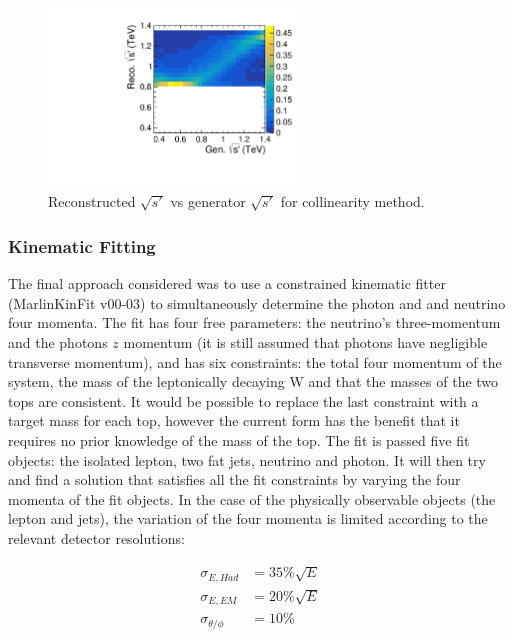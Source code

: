 \begin{figure}
  \centering
  \includegraphics[width=0.6\textwidth]{TopAnalysis/figures/ColEVsTrueE.pdf}
  \caption[Reconstructed $\sqrt{s'}$ vs generator $\sqrt{s'}$ for collinearity method]{Reconstructed $\sqrt{s'}$ vs generator $\sqrt{s'}$ for collinearity method.}
  \label{fig:CollinearitySPrime}
\end{figure}

\subsubsection{Kinematic Fitting}

The final approach considered was to use a constrained kinematic fitter (MarlinKinFit v00-03\cite{List:88030}) to simultaneously determine the photon and and neutrino four momenta. The fit has four free parameters: the neutrino's three-momentum and the photons $z$ momentum (it is still assumed that photons have negligible transverse momentum), and has six constraints: the total four momentum of the system, the mass of the leptonically decaying W and that the masses of the two tops are consistent. It would be possible to replace the last constraint with a target mass for each top, however the current form has the benefit that it requires no prior knowledge of the mass of the top. The fit is passed five fit objects: the isolated lepton, two fat jets, neutrino and photon.  It will then try and find a solution that satisfies all the fit constraints by varying the four momenta of the fit objects. In the case of the physically observable objects (the lepton and jets), the variation of the four momenta is limited according to the relevant detector resolutions:

\begin{align}
  \sigma_{E, Had}&=35\%\sqrt{E}
  \\
  \sigma_{E, EM}&=20\%\sqrt{E}
\\
  \sigma_{\theta/\phi}&=10\%
\end{align}


